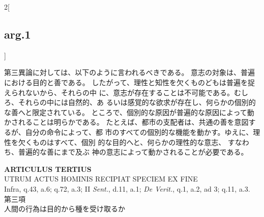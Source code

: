 \documentclass[paper=a4paper,fontsize=10pt,jafontsize=9pt,titlepage]{jlreq}
\begin{document}
\begin{paracol}{2}[\subsection{arg.1}]
\switchcolumn

第三異論に対しては、以下のように言われるべきである。
意志の対象は、普遍における目的と善である。
したがって、理性と知性を欠くものどもは普遍を捉えられないから、それらの中
 に、意志が存在することは不可能である。むしろ、それらの中には自然的、あ
 るいは感覚的な欲求が存在し、何らかの個別的な善へと限定されている。
ところで、個別的な原因が普遍的な原因によって動かされることは明らかである。
 たとえば、都市の支配者は、共通の善を意図するが、自分の命令によって、都
 市のすべての個別的な機能を動かす。ゆえに、理性を欠くものはすべて、個別
 的な目的へと、何らかの理性的な意志、
 すなわち、普遍的な善にまで及ぶ
神の意志によって動かされることが必要である。

\end{paracol}
\newpage






{}
\setcounter{section}{3}
\setcounter{subsection}{0}
\begin{center}
 {\Large {\bfseries ARTICULUS TERTIUS}}\\
 {\large UTRUM ACTUS HOMINIS RECIPIAT SPECIEM EX FINE}\\
 {\footnotesize Infra, q.43, a.6; q.72, a.3; II {\itshape Sent.}, d.11,
 a.1; {\itshape De Verit.}, q.1, a.2, ad 3; q.11, a.3.}\\
 {\Large 第三項\\人間の行為は目的から種を受け取るか}
\end{center}
\end{document}

